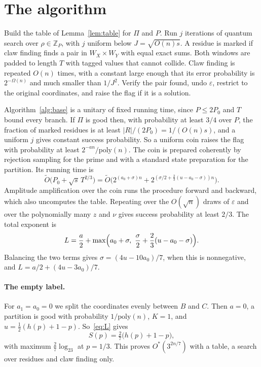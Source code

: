 \documentclass[11pt]{article}
\theoremstyle{remark}
\newcommand{\Ot}{\tilde O}
\begin{document}
\section{The algorithm}\label{sec:alg}

\begin{algorithm}[h]
\caption{Base procedure on a coin $(\Pi,P,j)$}\label{alg:base}
\begin{algorithmic}[1]
\State Build the table of Lemma~\ref{lem:table} for $\Pi$ and $P$.
\State Run $j$ iterations of quantum search over $\rho\in\mathbb Z_P$, with $j$ uniform below $J=\sqrt{O(n)s}$. A residue is marked if claw finding finds a pair in $W_X\times W_Y$ with equal exact sums. Both windows are padded to length $T$ with tagged values that cannot collide. Claw finding is repeated $O(n)$ times, with a constant large enough that its error probability is $2^{-\Omega(n)}$ and much smaller than $1/J^2$.
\State Verify the pair found, undo $\varepsilon$, restrict to the original coordinates, and raise the flag if it is a solution.
\end{algorithmic}
\end{algorithm}

Algorithm~\ref{alg:base} is a unitary of fixed running time, since $P\le2P_0$ and $T$ bound every branch. If $\Pi$ is good then, with probability at least $3/4$ over $P$, the fraction of marked residues is at least $|R|/(2P_0)=1/(O(n)s)$, and a uniform $j$ gives constant success probability. So a uniform coin raises the flag with probability at least $2^{-an}/\mathrm{poly}(n)$. The coin is prepared coherently by rejection sampling for the prime and with a standard state preparation for the partition. Its running time is
\[
\Ot\bigl(P_0+\sqrt s\,T^{2/3}\bigr)=\Ot\bigl(2^{(a_0+\sigma)n}+2^{(\sigma/2+\frac23(u-a_0-\sigma))n}\bigr).
\]
Amplitude amplification over the coin runs the procedure forward and backward, which also uncomputes the table. Repeating over the $O(\sqrt n)$ draws of $\varepsilon$ and over the polynomially many $z$ and $\nu$ gives success probability at least $2/3$. The total exponent is
\begin{equation}\label{eq:L}
L=\frac a2+\max\Bigl(a_0+\sigma,\ \frac\sigma2+\frac23(u-a_0-\sigma)\Bigr).
\end{equation}
Balancing the two terms gives $\sigma=(4u-10a_0)/7$, when this is nonnegative, and $L=a/2+(4u-3a_0)/7$.

\paragraph{The empty label.} For $a_1=a_0=0$ we split the coordinates evenly between $B$ and $C$. Then $a=0$, a partition is good with probability $1/\mathrm{poly}(n)$, $K=1$, and $u=\frac12(h(p)+1-p)$. So~\eqref{eq:L} gives
\[
S(p)=\tfrac27\bigl(h(p)+1-p\bigr),
\]
with maximum $\frac27\log_23$ at $p=1/3$. This proves $O^*(3^{2n/7})$ with a table, a search over residues and claw finding only.
\end{document}
